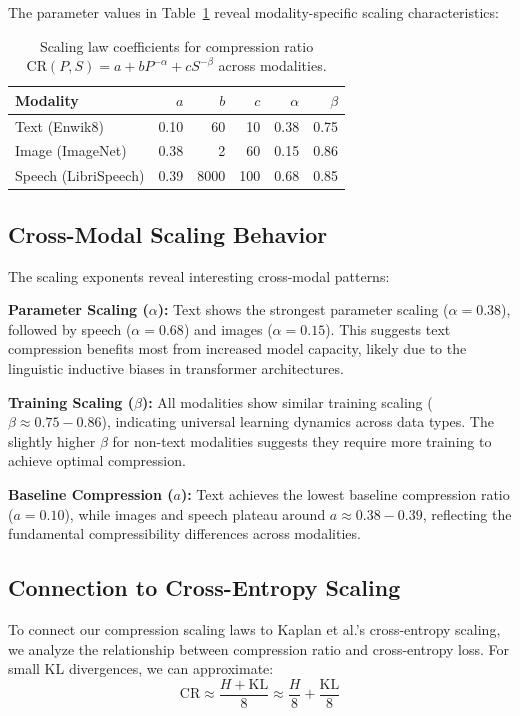 \documentclass[11pt]{article}
\begin{document}
The parameter values in Table~\ref{tab:scaling_coefficients} reveal modality-specific scaling characteristics:

\begin{table}[h]
\centering
\begin{tabular}{l r r r r r}
\toprule
Modality & $a$ & $b$ & $c$ & $\alpha$ & $\beta$ \\
\midrule
Text (Enwik8) & 0.10 & 60 & 10 & 0.38 & 0.75 \\
Image (ImageNet) & 0.38 & 2 & 60 & 0.15 & 0.86 \\
Speech (LibriSpeech) & 0.39 & 8000 & 100 & 0.68 & 0.85 \\
\bottomrule
\end{tabular}
\caption{Scaling law coefficients for compression ratio $\mathrm{CR}(P,S) = a + bP^{-\alpha} + cS^{-\beta}$ across modalities.}
\label{tab:scaling_coefficients}
\end{table}

\subsection{Cross-Modal Scaling Behavior}

The scaling exponents reveal interesting cross-modal patterns:

\textbf{Parameter Scaling ($\alpha$):} Text shows the strongest parameter scaling ($\alpha = 0.38$), followed by speech ($\alpha = 0.68$) and images ($\alpha = 0.15$). This suggests text compression benefits most from increased model capacity, likely due to the linguistic inductive biases in transformer architectures.

\textbf{Training Scaling ($\beta$):} All modalities show similar training scaling ($\beta \approx 0.75-0.86$), indicating universal learning dynamics across data types. The slightly higher $\beta$ for non-text modalities suggests they require more training to achieve optimal compression.

\textbf{Baseline Compression ($a$):} Text achieves the lowest baseline compression ratio ($a = 0.10$), while images and speech plateau around $a \approx 0.38-0.39$, reflecting the fundamental compressibility differences across modalities.

\subsection{Connection to Cross-Entropy Scaling}

To connect our compression scaling laws to Kaplan et al.'s cross-entropy scaling, we analyze the relationship between compression ratio and cross-entropy loss. For small KL divergences, we can approximate:
\[
\mathrm{CR} \approx \frac{H + \mathrm{KL}}{8} \approx \frac{H}{8} + \frac{\mathrm{KL}}{8}
\]
\end{document}
